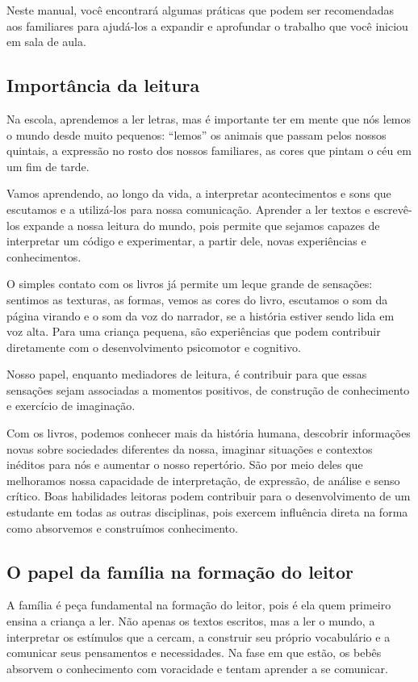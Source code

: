 \documentclass[11pt]{extarticle}
\begin{document}
Neste manual, você encontrará algumas práticas que podem ser 
recomendadas aos familiares para ajudá-los a expandir e aprofundar o trabalho 
que você iniciou em sala de aula.


\subsection{Importância da leitura}
Na escola, aprendemos a ler letras, mas é importante ter em mente que nós 
lemos o mundo desde muito pequenos: “lemos” os animais que passam pelos nossos 
quintais, a expressão no rosto dos nossos familiares, as cores que pintam o céu 
em um fim de tarde. 

Vamos aprendendo, ao longo da vida, a interpretar acontecimentos 
e sons que escutamos e a utilizá-los para nossa comunicação. Aprender a ler textos e 
escrevê-los expande a nossa leitura do mundo, pois permite que sejamos capazes de 
interpretar um código e experimentar, a partir dele, novas experiências e conhecimentos. 

O simples contato com os livros já permite um leque grande de sensações: 
sentimos as texturas, as formas, vemos as cores do livro, escutamos o som da página 
virando e o som da voz do narrador, se a história estiver sendo lida em voz alta. Para uma 
criança pequena, são experiências que podem contribuir diretamente com o desenvolvimento psicomotor 
e cognitivo. 

Nosso papel, enquanto mediadores de leitura, é contribuir para que essas 
sensações sejam associadas a momentos positivos, de construção de 
conhecimento e exercício de imaginação. 

Com os livros, podemos conhecer mais da história humana, descobrir informações 
novas sobre sociedades diferentes da nossa, imaginar situações e contextos inéditos 
para nós e aumentar o nosso repertório. São por meio deles que melhoramos nossa 
capacidade de interpretação, de expressão, de análise e senso crítico. Boas habilidades 
leitoras podem contribuir para o desenvolvimento de um estudante em todas as outras 
disciplinas, pois exercem influência direta na forma como absorvemos e 
construímos conhecimento.


\subsection{O papel da família na formação do leitor}
A família é peça fundamental na formação do leitor, pois é ela quem primeiro 
ensina a criança a ler. Não apenas os textos escritos, mas a ler o mundo, a 
interpretar os estímulos que a cercam, a construir seu próprio vocabulário e a 
comunicar seus pensamentos e necessidades. Na fase em que estão, os bebês 
absorvem o conhecimento com voracidade e tentam aprender a se comunicar. 
\end{document}
